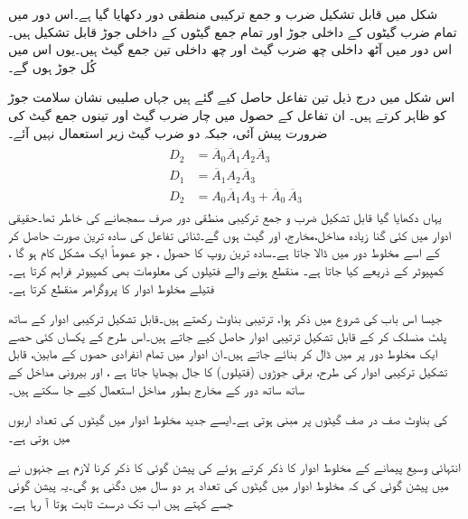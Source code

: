 شکل  میں قابل تشکیل ضرب و جمع ترکیبی منطقی دور دکھایا گیا ہے۔اس دور میں تمام ضرب گیٹوں کے داخلی جوڑ اور تمام جمع گیٹوں کے داخلی جوڑ قابل تشکیل ہیں۔اس دور میں آٹھ داخلی چھ ضرب گیٹ اور چھ داخلی تین جمع گیٹ ہیں۔یوں اس میں کُل جوڑ  ہوں گے۔

اس شکل میں درج ذیل تین تفاعل حاصل کیے گئے ہیں جہاں صلیبی نشان سلامت جوڑ کو ظاہر کرتے ہیں۔ ان تفاعل کے حصول میں چار ضرب گیٹ اور تینوں جمع گیٹ کی ضرورت پیش آئی، جبکہ دو ضرب گیٹ زیر استعمال نہیں آئے۔
\begin{gather}
\begin{aligned}
D_2&=\overline{A}_0\overline{A}_1 A_2 \overline{A}_3\\
D_1&=\overline{A}_1A_2 \overline{A}_3\\
D_2&=A_0\overline{A}_1A_3+\overline{A}_0\,\overline{A}_3
\end{aligned}
\end{gather}
 یہاں دکھایا گیا قابل تشکیل ضرب و جمع ترکیبی منطقی دور صرف سمجھانے کی خاطر تھا۔حقیقی ادوار میں کئی گنا زیادہ مداخل،مخارج، اور گیٹ ہوں گے۔ثنائی تفاعل کی سادہ ترین صورت حاصل کر کے اسے مخلوط دور میں ڈالا جاتا ہے۔سادہ ترین روپ کا حصول ، جو عموماً ایک مشکل کام ہو گا ، کمپیوٹر کے ذریعے کیا جاتا ہے۔ منقطع ہونے والے فتیلوں کی معلومات بھی کمپیوٹر فراہم کرتا ہے۔فتیلے مخلوط ادوار کا پروگرامر منقطع کرتا ہے۔


جیسا اس باب کی شروع میں ذکر ہوا،  ترتیبی بناوٹ رکھتے ہیں۔قابل تشکیل ترکیبی ادوار کے ساتھ پلٹ منسلک کر کے قابل تشکیل ترتیبی ادوار حاصل کیے جاتے ہیں۔اس طرح کے یکساں کئی حصے ایک مخلوط دور پر میں ڈال کر  بنائے جاتے ہیں۔ان ادوار میں تمام انفرادی حصوں کے مابین، قابل تشکیل ترکیبی ادوار کی طرح، برقی جوڑوں (فتیلوں) کا جال بچھایا جاتا ہے ، اور بیرونی مداخل کے ساتھ ساتھ دور کے مخارج بطور مداخل استعمال کیے جا سکتے ہیں۔

 کی بناوٹ صف در صف گیٹوں پر مبنی ہوتی ہے۔ایسے جدید مخلوط ادوار میں گیٹوں کی تعداد اربوں میں ہوتی ہے۔

انتہائی وسیع پیمانے کے مخلوط ادوار کا ذکر کرتے ہوئے  کی پیشن گوئی کا ذکر کرنا لازم ہے جنہوں نے  میں پیشن گوئی کی کہ مخلوط ادوار میں گیٹوں کی تعداد ہر دو سال میں دگنی ہو گی۔یہ پیشن گوئی جسے  کہتے ہیں اب تک درست ثابت ہوتا آ رہا ہے۔

